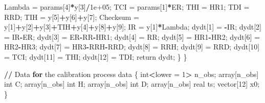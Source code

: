 \documentclass[10pt,letterpaper]{article}
\newenvironment{Shaded}{\begin{snugshade}}{\end{snugshade}}
\newcommand{\ControlFlowTok}[1]{\textcolor[rgb]{0.13,0.29,0.53}{\textbf{#1}}}
\newcommand{\DecValTok}[1]{\textcolor[rgb]{0.00,0.00,0.81}{#1}}
\newcommand{\ErrorTok}[1]{\textcolor[rgb]{0.64,0.00,0.00}{\textbf{#1}}}
\newcommand{\FloatTok}[1]{\textcolor[rgb]{0.00,0.00,0.81}{#1}}
\newcommand{\NormalTok}[1]{#1}
\newcommand{\OtherTok}[1]{\textcolor[rgb]{0.56,0.35,0.01}{#1}}
\newcommand{\SpecialCharTok}[1]{\textcolor[rgb]{0.81,0.36,0.00}{\textbf{#1}}}
\begin{document}
\begin{Shaded}
\begin{Highlighting}[]
\NormalTok{    Lambda }\OtherTok{=}\NormalTok{ params[}\DecValTok{4}\NormalTok{]}\SpecialCharTok{*}\NormalTok{y[}\DecValTok{3}\NormalTok{]}\SpecialCharTok{/}\FloatTok{1e+05}\NormalTok{;}
\NormalTok{    TCI }\OtherTok{=}\NormalTok{ params[}\DecValTok{1}\NormalTok{]}\SpecialCharTok{*}\NormalTok{ER;}
\NormalTok{    THI }\OtherTok{=}\NormalTok{ HR1;}
\NormalTok{    TDI }\OtherTok{=}\NormalTok{ RRD;}
\NormalTok{    TIH }\OtherTok{=}\NormalTok{ y[}\DecValTok{5}\NormalTok{]}\SpecialCharTok{+}\NormalTok{y[}\DecValTok{6}\NormalTok{]}\SpecialCharTok{+}\NormalTok{y[}\DecValTok{7}\NormalTok{];}
\NormalTok{    Checksum }\OtherTok{=}\NormalTok{ y[}\DecValTok{1}\NormalTok{]}\SpecialCharTok{+}\NormalTok{y[}\DecValTok{2}\NormalTok{]}\SpecialCharTok{+}\NormalTok{y[}\DecValTok{3}\NormalTok{]}\SpecialCharTok{+}\NormalTok{TIH}\SpecialCharTok{+}\NormalTok{y[}\DecValTok{4}\NormalTok{]}\SpecialCharTok{+}\NormalTok{y[}\DecValTok{8}\NormalTok{]}\SpecialCharTok{+}\NormalTok{y[}\DecValTok{9}\NormalTok{];}
\NormalTok{    IR }\OtherTok{=}\NormalTok{ y[}\DecValTok{1}\NormalTok{]}\SpecialCharTok{*}\NormalTok{Lambda;}
\NormalTok{    dydt[}\DecValTok{1}\NormalTok{] }\OtherTok{=} \SpecialCharTok{{-}}\NormalTok{IR;}
\NormalTok{    dydt[}\DecValTok{2}\NormalTok{] }\OtherTok{=}\NormalTok{ IR}\SpecialCharTok{{-}}\NormalTok{ER;}
\NormalTok{    dydt[}\DecValTok{3}\NormalTok{] }\OtherTok{=}\NormalTok{ ER}\SpecialCharTok{{-}}\NormalTok{RR}\SpecialCharTok{{-}}\NormalTok{HR1;}
\NormalTok{    dydt[}\DecValTok{4}\NormalTok{] }\OtherTok{=}\NormalTok{ RR;}
\NormalTok{    dydt[}\DecValTok{5}\NormalTok{] }\OtherTok{=}\NormalTok{ HR1}\SpecialCharTok{{-}}\NormalTok{HR2;}
\NormalTok{    dydt[}\DecValTok{6}\NormalTok{] }\OtherTok{=}\NormalTok{ HR2}\SpecialCharTok{{-}}\NormalTok{HR3;}
\NormalTok{    dydt[}\DecValTok{7}\NormalTok{] }\OtherTok{=}\NormalTok{ HR3}\SpecialCharTok{{-}}\NormalTok{RRH}\SpecialCharTok{{-}}\NormalTok{RRD;}
\NormalTok{    dydt[}\DecValTok{8}\NormalTok{] }\OtherTok{=}\NormalTok{ RRH;}
\NormalTok{    dydt[}\DecValTok{9}\NormalTok{] }\OtherTok{=}\NormalTok{ RRD;}
\NormalTok{    dydt[}\DecValTok{10}\NormalTok{] }\OtherTok{=}\NormalTok{ TCI;}
\NormalTok{    dydt[}\DecValTok{11}\NormalTok{] }\OtherTok{=}\NormalTok{ THI;}
\NormalTok{    dydt[}\DecValTok{12}\NormalTok{] }\OtherTok{=}\NormalTok{ TDI;}
\NormalTok{    return dydt;}
\NormalTok{  \}}
\NormalTok{\}}

\SpecialCharTok{/}\ErrorTok{/}\NormalTok{ Data }\ControlFlowTok{for}\NormalTok{ the calibration process}
\NormalTok{data \{}
\NormalTok{  int}\SpecialCharTok{\textless{}}\NormalTok{lower }\OtherTok{=} \DecValTok{1}\SpecialCharTok{\textgreater{}}\NormalTok{ n\_obs;}
\NormalTok{  array[n\_obs] int C;}
\NormalTok{  array[n\_obs] int H;}
\NormalTok{  array[n\_obs] int D;}
\NormalTok{  array[n\_obs] real ts;}
\NormalTok{  vector[}\DecValTok{12}\NormalTok{] x0;}
\NormalTok{\}}



\end{Highlighting}
\end{Shaded}
\end{document}
